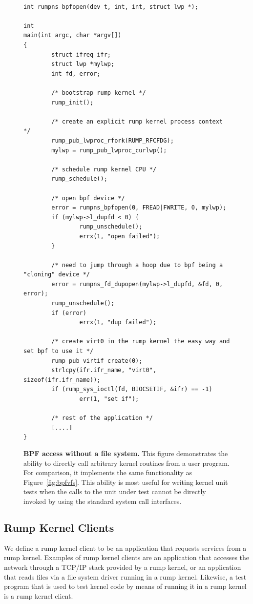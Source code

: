 \begin{figure}
{\tt \scriptsize
\begin{verbatim}
int rumpns_bpfopen(dev_t, int, int, struct lwp *);

int
main(int argc, char *argv[])
{
        struct ifreq ifr;
        struct lwp *mylwp;
        int fd, error;

        /* bootstrap rump kernel */
        rump_init();

        /* create an explicit rump kernel process context */
        rump_pub_lwproc_rfork(RUMP_RFCFDG);
        mylwp = rump_pub_lwproc_curlwp();

        /* schedule rump kernel CPU */
        rump_schedule();

        /* open bpf device */
        error = rumpns_bpfopen(0, FREAD|FWRITE, 0, mylwp);
        if (mylwp->l_dupfd < 0) {
                rump_unschedule();
                errx(1, "open failed");
        }

        /* need to jump through a hoop due to bpf being a "cloning" device */
        error = rumpns_fd_dupopen(mylwp->l_dupfd, &fd, 0, error);
        rump_unschedule();
        if (error)
                errx(1, "dup failed");

        /* create virt0 in the rump kernel the easy way and set bpf to use it */
        rump_pub_virtif_create(0);
        strlcpy(ifr.ifr_name, "virt0", sizeof(ifr.ifr_name));
        if (rump_sys_ioctl(fd, BIOCSETIF, &ifr) == -1)
                err(1, "set if");

        /* rest of the application */
        [....]
}
\end{verbatim}}
\caption[BPF access without a file system]{\textbf{BPF access without
a file system.}  This figure demonstrates the ability to directly
call arbitrary kernel routines from a user program.  For comparison,
it implements the same functionality as Figure~\ref{fig:bpfvfs}.
This ability is most useful for writing kernel unit tests when the calls
to the unit under test cannot be directly invoked by using the standard
system call interfaces.}
\label{fig:bpfdirect}
\end{figure}

\subsection{Rump Kernel Clients}
\label{sect:clitax}

We define a rump kernel client to be an application that requests
services from a rump kernel.  Examples of rump kernel clients are
an application that accesses the network through a TCP/IP stack
provided by a rump kernel, or an application that reads files via
a file system driver running in a rump kernel.  Likewise, a test
program that is used to test kernel code by means of running it
in a rump kernel is a rump kernel client.

